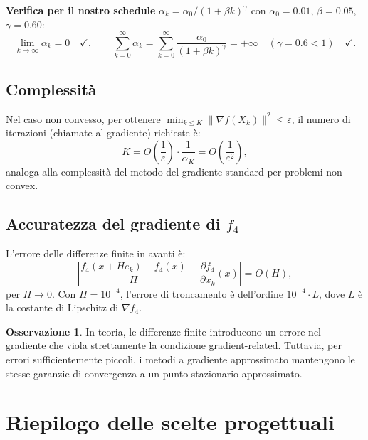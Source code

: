 \documentclass[12pt,a4paper]{article}
\theoremstyle{definition}
\newtheorem{remark}[theorem]{Osservazione}
\newcommand{\grad}{\nabla}
\begin{document}
\textbf{Verifica per il nostro schedule} $\alpha_k = \alpha_0 / (1 + \beta k)^\gamma$
con $\alpha_0 = 0.01$, $\beta = 0.05$, $\gamma = 0.60$:
\[
  \lim_{k\to\infty} \alpha_k = 0 \quad\checkmark, \qquad
  \sum_{k=0}^\infty \alpha_k = \sum_{k=0}^\infty \frac{\alpha_0}{(1+\beta k)^\gamma}
  = +\infty \quad (\gamma = 0.6 < 1) \quad\checkmark.
\]

\subsection{Complessità}

Nel caso non convesso, per ottenere $\min_{k \leq K} \|\grad f(X_k)\|^2 \leq \varepsilon$,
il numero di iterazioni (chiamate al gradiente) richieste è:
\[
  K = O\!\left(\frac{1}{\varepsilon}\right) \cdot \frac{1}{\alpha_K} = O\!\left(\frac{1}{\varepsilon^2}\right),
\]
analoga alla complessità del metodo del gradiente standard per problemi non convex.

\subsection{Accuratezza del gradiente di $f_4$}

L'errore delle differenze finite in avanti è:
\[
  \left|\frac{f_4(x + H e_k) - f_4(x)}{H} - \frac{\partial f_4}{\partial x_k}(x)\right|
  = O(H),
\]
per $H \to 0$. Con $H = 10^{-4}$, l'errore di troncamento è dell'ordine $10^{-4} \cdot L$,
dove $L$ è la costante di Lipschitz di $\grad f_4$.

\begin{remark}
In teoria, le differenze finite introducono un errore nel gradiente che viola strettamente
la condizione gradient-related. Tuttavia, per errori sufficientemente piccoli, i metodi
a gradiente approssimato mantengono le stesse garanzie di convergenza a un punto stazionario
approssimato.
\end{remark}

\section{Riepilogo delle scelte progettuali}
\end{document}
